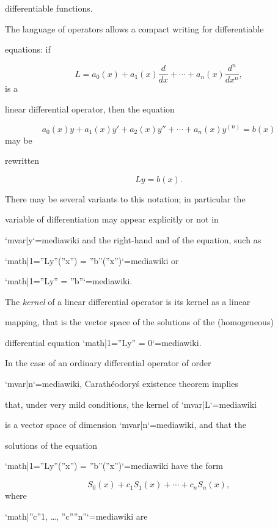 differentiable functions.



The language of operators allows a compact writing for differentiable

equations: if



$$L=a_0(x)+a_1(x)\frac{d}{dx} + \cdots +a_n(x)\frac{d^n}{dx^n},$$ is a

linear differential operator, then the equation



$$a_0(x)y +a_1(x)y' + a_2(x)y'' +\cdots +a_n(x)y^{(n)}=b(x)$$ may be

rewritten



$$Ly=b(x).$$



There may be several variants to this notation; in particular the

variable of differentiation may appear explicitly or not in

`{{mvar|y}}`{=mediawiki} and the right-hand and of the equation, such as

`{{math|1=''Ly''(''x'') = ''b''(''x'')}}`{=mediawiki} or

`{{math|1=''Ly'' = ''b''}}`{=mediawiki}.



The \textit{kernel} of a linear differential operator is its kernel as a linear

mapping, that is the vector space of the solutions of the (homogeneous)

differential equation `{{math|1=''Ly'' = 0}}`{=mediawiki}.



In the case of an ordinary differential operator of order

`{{mvar|n}}`{=mediawiki}, Carathéodory\'s existence theorem implies

that, under very mild conditions, the kernel of `{{mvar|L}}`{=mediawiki}

is a vector space of dimension `{{mvar|n}}`{=mediawiki}, and that the

solutions of the equation

`{{math|1=''Ly''(''x'') = ''b''(''x'')}}`{=mediawiki} have the form



$$S_0(x) + c_1S_1(x) + \cdots +c_nS_n(x),$$ where

`{{math|''c''1, …, ''c''''n''}}`{=mediawiki} are

